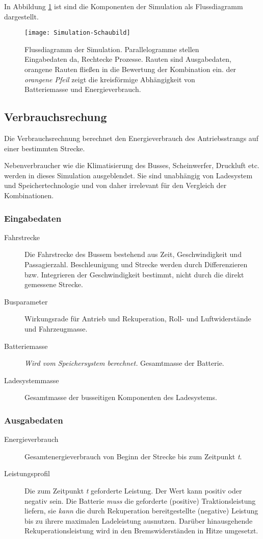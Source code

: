 In Abbildung \ref{abb_sim} ist sind die Komponenten der Simulation als Flussdiagramm dargestellt.

\begin{figure}\centering
	\texttt{[image: Simulation-Schaubild]}
	\caption[Flussdiagramm der Simulation]{Flussdiagramm der Simulation. Parallelogramme stellen Eingabedaten da, Rechtecke Prozesse. Rauten sind Ausgabedaten, orangene Rauten fließen in die Bewertung der Kombination ein. der \emph{orangene Pfeil}  zeigt die kreisförmige Abhängigkeit von Batteriemasse und Energieverbrauch.}
	\label{abb_sim}
\end{figure}

\subsection{Verbrauchsrechung}
Die Verbrauchsrechnung berechnet den Energieverbrauch des Antriebsstrangs auf einer bestimmten Strecke.

Nebenverbraucher wie die Klimatisierung des Busses, Scheinwerfer, Druckluft etc. werden in dieses Simulation ausgeblendet. Sie sind unabhängig von Ladesystem und Speichertechnologie und von daher irrelevant für den Vergleich der Kombinationen.

\subsubsection{Eingabedaten}
\begin{description}
	\item[Fahrstrecke] Die Fahrstrecke des Bussem bestehend aus Zeit, Geschwindigkeit und Passagierzahl. Beschleunigung und Strecke werden durch Differenzieren bzw. Integrieren der Geschwindigkeit bestimmt, nicht durch die direkt gemessene Strecke.
	\item[Busparameter] Wirkungsrade für Antrieb und Rekuperation, Roll- und Luftwiderstände und Fahrzeugmasse.
	\item[Batteriemasse] \emph{Wird vom Speichersystem berechnet.} Gesamtmasse der Batterie.
	\item[Ladesystemmasse] Gesamtmasse der busseitigen Komponenten des Ladesystems.
\end{description}

\subsubsection{Ausgabedaten}
\begin{description}
	\item[Energieverbrauch] Gesamtenergieverbrauch von Beginn der Strecke bis zum  Zeitpunkt \emph{t}.
	\item[Leistungsprofil] Die zum Zeitpunkt \emph{t} geforderte Leistung. Der Wert kann positiv oder negativ sein. Die Batterie \emph{muss} die geforderte (positive) Traktionsleistung liefern, sie \emph{kann} die durch Rekuperation bereitgestellte (negative) Leistung bis zu ihrere maximalen Ladeleistung ausnutzen. Darüber hinausgehende Rekuperationsleistung wird in den Bremswiderständen in Hitze umgesetzt.
\end{description}

